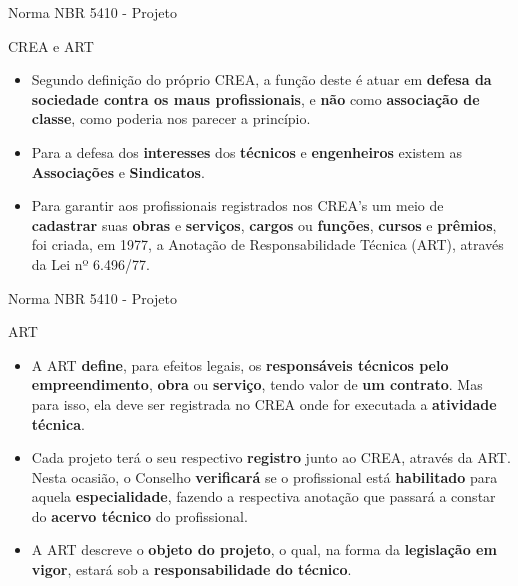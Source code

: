 \begin{frame}{Norma NBR 5410 - Projeto}
	\begin{block}{CREA e ART}
		\begin{itemize}
			\item Segundo definição do próprio CREA, a função deste é atuar em \textbf{defesa da sociedade contra os maus profissionais}, e \textbf{não} como \textbf{associação de classe}, como poderia nos parecer a princípio.
			\item Para a defesa dos \textbf{interesses} dos \textbf{técnicos} e \textbf{engenheiros} existem as \textbf{Associações} e \textbf{Sindicatos}.
			\item Para garantir aos profissionais registrados nos CREA's um meio de \textbf{cadastrar }suas \textbf{obras }e \textbf{serviços}, \textbf{cargos }ou \textbf{funções}, \textbf{cursos }e \textbf{prêmios}, foi criada, em 1977, a Anotação de Responsabilidade Técnica (ART), através da Lei nº 6.496/77.
		\end{itemize}
	\end{block}
\end{frame}


\begin{frame}{Norma NBR 5410 - Projeto}
	\begin{block}{ART}
		\begin{itemize}
			\item A ART \textbf{define}, para efeitos legais, os \textbf{responsáveis técnicos pelo empreendimento}, \textbf{obra} ou \textbf{serviço}, tendo valor de \textbf{um contrato}. Mas para isso, ela deve ser registrada no CREA onde for executada a \textbf{atividade técnica}.
			\item Cada projeto terá o seu respectivo \textbf{registro} junto ao CREA, através da ART. Nesta ocasião, o Conselho \textbf{verificará} se o profissional está \textbf{habilitado} para aquela \textbf{especialidade}, fazendo a respectiva anotação que passará a constar do \textbf{acervo técnico} do profissional.
			\item A ART descreve o \textbf{objeto do projeto}, o qual, na forma da \textbf{legislação em vigor}, estará sob a \textbf{responsabilidade do técnico}.
		\end{itemize}
	\end{block}
\end{frame}


